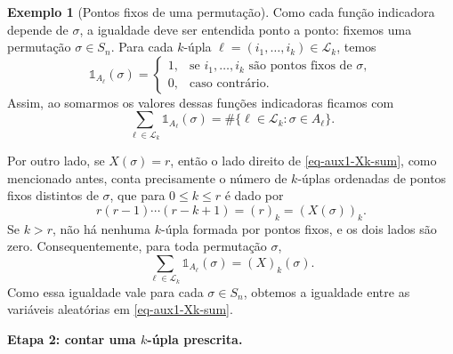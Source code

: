 \documentclass[12pt,portuguese]{article}
\theoremstyle{definition}
\newtheorem{example}[example]{Exemplo}
\theoremstyle{plainexercise}
\theoremstyle{starredexercise}
\theoremstyle{definition}
\begin{document}
\begin{example}[Pontos fixos de uma permutação]
Como cada função indicadora
depende de $\sigma$, a igualdade deve ser entendida ponto a ponto: fixemos
uma permutação $\sigma\in S_n$. Para cada $k$-úpla
$\ell=(i_1,\ldots,i_k)\in\mathcal{L}_k$, temos
\[
\mathds{1}_{A_{\ell}}(\sigma)
=
\begin{cases}
1,&\text{se }i_1,\ldots,i_k\text{ são pontos fixos de }\sigma,\\
0,&\text{caso contrário}.
\end{cases}
\]
Assim, ao somarmos os valores dessas funções indicadoras ficamos com 
\[
\sum_{\ell\in\mathcal{L}_k}\mathds{1}_{A_{\ell}}(\sigma)
=\#\bigl\{\ell\in\mathcal{L}_k:\sigma\in A_{\ell}\bigr\}.
\]

Por outro lado, se $X(\sigma)=r$, então o lado direito de \eqref{eq-aux1-Xk-sum},
como mencionado antes, conta precisamente o número de $k$-úplas ordenadas
de pontos fixos distintos de $\sigma$, que para $0\leqslant k\leqslant r$ é dado por
\[
r(r-1)\cdots(r-k+1)=(r)_k=(X(\sigma))_k.
\]
Se $k>r$, não há nenhuma $k$-úpla formada por pontos fixos, e os dois lados
são zero. Consequentemente, para toda permutação $\sigma$,
\[
\sum_{\ell\in\mathcal{L}_k}\mathds{1}_{A_{\ell}}(\sigma)
=(X)_k(\sigma).
\]
Como essa igualdade vale para cada $\sigma\in S_n$, obtemos a igualdade
entre as variáveis aleatórias em \eqref{eq-aux1-Xk-sum}.



\medskip
\noindent\textbf{Etapa 2: contar uma $k$-úpla prescrita.}


\end{example}
\end{document}
